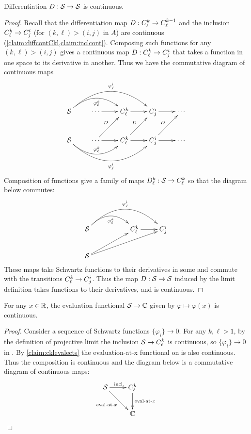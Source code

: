       \begin{thm}
        Differentiation $D:\S\rightarrow\S$ is continuous.
      \end{thm}
      \begin{proof}
        Recall that the differentiation map $D:\Ckl\rightarrow\Ckml$ and the inclusion $\Ckl\rightarrow\Cij$ (for $(k,\ell)>(i,j)$ in $A$) are continuous (\cref{claim:diffcontCkl,claim:inclcont}).
         Composing such functions for any $(k,\ell)>(i,j)$ gives a continuous map $D:\Ckl\rightarrow\Cij$ that takes a function in one space to its derivative in another.
        Thus we have the commutative diagram of continuous maps
        \begin{displaymath}
          \xymatrix{
            \S \ar@/^20pt/[rr]_{\varphi^k_\ell} \ar@/^30pt/[rrr]^{\varphi^i_j} & \cdots \ar[r] & \Ckl \ar[r] & \Cij \ar[r] & \cdots \\
            \S \ar@/_20pt/[rr]^{\varphi^k_\ell} \ar@/_30pt/[rrr]_{\varphi^i_j} & \cdots \ar[r] \ar[ur]^D & \Ckl \ar[r] \ar[ur]^D & \Cij \ar[r] \ar[ur]^D & \cdots\\
          }
        \end{displaymath}
        Composition of functions give a family of maps $D^k_\ell:\S\rightarrow\Ckl$ so that the diagram below commutes:
        \begin{displaymath}
          \xymatrix{
            \S \ar@/^20pt/[rr]_{\varphi^k_\ell} \ar@/^30pt/[rrr]^{\varphi^i_j} && \Ckl \ar[r] & \Cij \\
            \S \ar[urr] \ar[urrr] \\
          }
        \end{displaymath}
        These maps take Schwartz functions to their derivatives in some \Ckl and commute with the transitions $\Ckl\rightarrow\Cij$.
        Thus the map $D:\S\rightarrow\S$ induced by the limit definition takes functions to their derivatives, and is continuous.
      \end{proof}

      \begin{thm}
        \label{thm:sevalcts}
        For any $x\in\R$, the evaluation functional $\S\rightarrow\C$ given by $ \varphi\mapsto\varphi(x) $ is continuous.
      \end{thm}
      \begin{proof}
        Consider a sequence of Schwartz functions $\{\varphi_i\}\rightarrow0$.
        For any $k,\ell>1$, by the definition of projective limit the inclusion $\S\rightarrow\Ckl$ is continuous, so $\{\varphi_i\}\rightarrow 0$ in \Ckl.
        By \cref{claim:cklevalects} the evaluation-at-x functional on \Ckl is also continuous.
        Thus the composition is continuous and the diagram below is a commutative diagram of continuous maps:
        \begin{displaymath}
          \xymatrix{
          \S \ar[r]^{\text{incl.}} \ar[dr]_{\text{eval-at-}x} & \Ckl \ar[d]^{\text{eval-at-}x}\\
          & \C
          }
        \end{displaymath}
      \end{proof}


